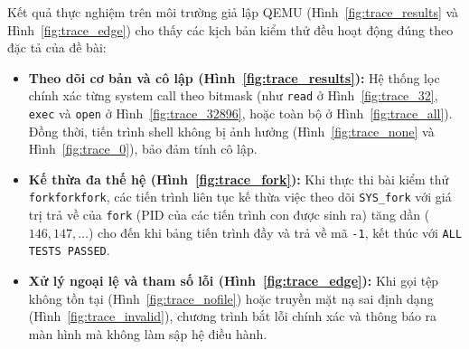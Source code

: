 Kết quả thực nghiệm trên môi trường giả lập QEMU (Hình~\ref{fig:trace_results} và Hình~\ref{fig:trace_edge}) cho thấy các kịch bản kiểm thử đều hoạt động đúng theo đặc tả của đề bài:
\begin{itemize}[noitemsep, topsep=2pt]
    \item \textbf{Theo dõi cơ bản và cô lập (Hình~\ref{fig:trace_results}):} Hệ thống lọc chính xác từng system call theo bitmask (như \texttt{read} ở Hình~\ref{fig:trace_32}, \texttt{exec} và \texttt{open} ở Hình~\ref{fig:trace_32896}, hoặc toàn bộ ở Hình~\ref{fig:trace_all}). Đồng thời, tiến trình shell không bị ảnh hưởng (Hình~\ref{fig:trace_none} và Hình~\ref{fig:trace_0}), bảo đảm tính cô lập.
    \item \textbf{Kế thừa đa thế hệ (Hình~\ref{fig:trace_fork}):} Khi thực thi bài kiểm thử \texttt{forkforkfork}, các tiến trình liên tục kế thừa việc theo dõi \texttt{SYS\_fork} với giá trị trả về của \texttt{fork} (PID của các tiến trình con được sinh ra) tăng dần ($146, 147, \dots$) cho đến khi bảng tiến trình đầy và trả về mã \texttt{-1}, kết thúc với \texttt{ALL TESTS PASSED}.
    \item \textbf{Xử lý ngoại lệ và tham số lỗi (Hình~\ref{fig:trace_edge}):} Khi gọi tệp không tồn tại (Hình~\ref{fig:trace_nofile}) hoặc truyền mặt nạ sai định dạng (Hình~\ref{fig:trace_invalid}), chương trình bắt lỗi chính xác và thông báo ra màn hình mà không làm sập hệ điều hành.
\end{itemize}

